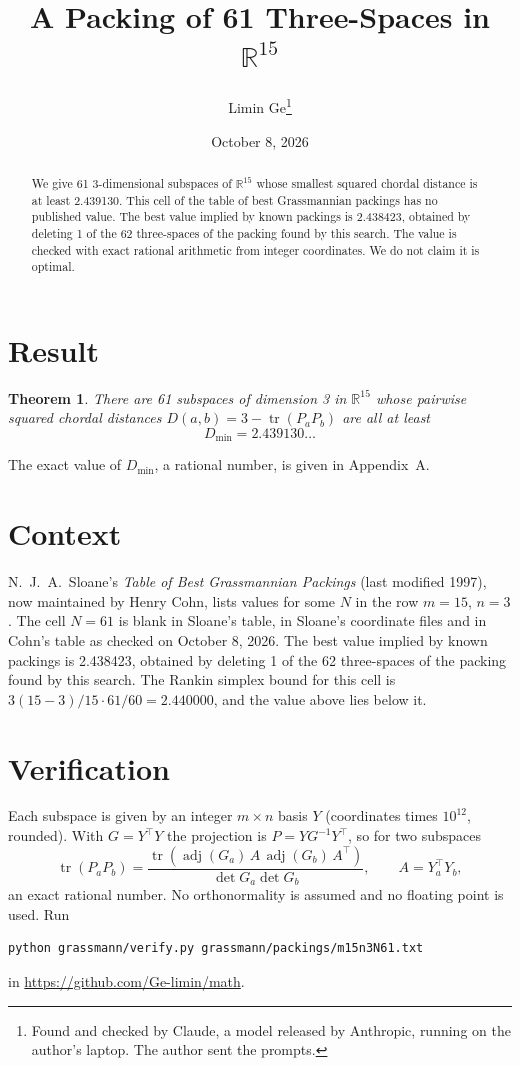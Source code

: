 \documentclass[11pt,a4paper]{article}
\title{A Packing of 61 Three-Spaces in $\mathbb{R}^{15}$}
\author{Limin Ge\thanks{Found and checked by Claude, a model released by Anthropic, running on the author's laptop. The author sent the prompts.}}
\date{October 8, 2026}
\newtheorem*{theorem}{Theorem}
\begin{document}
\maketitle
\begin{abstract}
We give 61 3-dimensional subspaces of $\mathbb{R}^{15}$ whose smallest squared chordal distance is at least 2.439130. This cell of the table of best Grassmannian packings has no published value. The best value implied by known packings is 2.438423, obtained by deleting 1 of the 62 three-spaces of the packing found by this search. The value is checked with exact rational arithmetic from integer coordinates. We do not claim it is optimal.
\end{abstract}

\section{Result}
\begin{theorem}
There are 61 subspaces of dimension 3 in $\mathbb{R}^{15}$ whose pairwise squared chordal distances $D(a,b) = 3 - \operatorname{tr}(P_aP_b)$ are all at least
\[ D_{\min} = 2.439130\ldots \]
\end{theorem}
The exact value of $D_{\min}$, a rational number, is given in Appendix~A.


\section{Context}
N.~J.~A.~Sloane's \emph{Table of Best Grassmannian Packings} (last modified 1997), now maintained by Henry Cohn, lists values for some $N$ in the row $m=15$, $n=3$. The cell $N=61$ is blank in Sloane's table, in Sloane's coordinate files and in Cohn's table as checked on October 8, 2026. The best value implied by known packings is 2.438423, obtained by deleting 1 of the 62 three-spaces of the packing found by this search. The Rankin simplex bound for this cell is $3(15-3)/15\cdot 61/60 = 2.440000$, and the value above lies below it.


\section{Verification}
Each subspace is given by an integer $m\times n$ basis $Y$ (coordinates times $10^{12}$, rounded). With $G=Y^\top Y$ the projection is $P=YG^{-1}Y^\top$, so for two subspaces
\[ \operatorname{tr}(P_aP_b)=\frac{\operatorname{tr}(\operatorname{adj}(G_a)\,A\,\operatorname{adj}(G_b)\,A^\top)}{\det G_a\det G_b},\qquad A=Y_a^\top Y_b, \]
an exact rational number. No orthonormality is assumed and no floating point is used. Run
\begin{verbatim}
python grassmann/verify.py grassmann/packings/m15n3N61.txt
\end{verbatim}
in \url{https://github.com/Ge-limin/math}.
\end{document}
